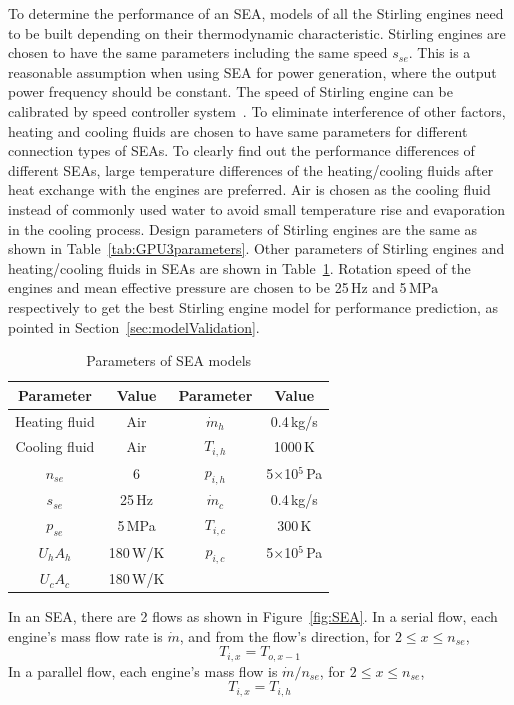 To determine the performance of an SEA, models of all the Stirling engines need to be built depending on their thermodynamic characteristic. Stirling engines are chosen to have the same parameters including the same speed $s_{se}$. This is a reasonable assumption when using SEA for power generation, where the output power frequency should be constant. The speed of Stirling engine can be calibrated by speed controller system~\cite{Hooshang2016}. To eliminate interference of other factors, heating and cooling fluids are chosen to have same parameters for different connection types of SEAs. To clearly find out the performance differences of different SEAs, large temperature differences of the heating/cooling fluids after heat exchange with the engines are preferred. Air is chosen as the cooling fluid instead of commonly used water to avoid small temperature rise and evaporation in the cooling process. Design parameters of Stirling engines are the same as shown in Table~\ref{tab:GPU3parameters}. Other parameters of Stirling engines and heating/cooling fluids in SEAs are shown in Table~\ref{tab:parameters}. Rotation speed of the engines and mean effective pressure are chosen to be 25$\,\mathrm{Hz}$ and 5$\,\mathrm{MPa}$ respectively to get the best Stirling engine model for performance prediction, as pointed in Section~\ref{sec:modelValidation}.

\begin{table}[htbp]
	\caption{Parameters of SEA models}
	\begin{center}
	\begin{tabular}{cccc}
		\toprule
		Parameter		&	Value	& Parameter	&	Value\\
		\midrule
		Heating fluid	&	Air		&	$\dot{m}_h$	&	0.4\,kg/s\\
		Cooling fluid	&	Air	&	$T_{i,h}$	&	1000\,K\\
		$n_{se}$	&	6	&	$p_{i,h}$	&	5$\times$10$^5$\,Pa\\
		$s_{se}$	&	25\,Hz	&	$\dot{m}_c$	&	0.4\,kg/s\\
		$p_{se}$		&	5\,MPa	&	$T_{i,c}$	&	300\,K\\
		$U_hA_h$	&	180\,W/K	&	$p_{i,c}$	&	5$\times$10$^5$\,Pa\\
		$U_cA_c$		&	180\,W/K	&&\\
		\bottomrule
	\end{tabular}
	\end{center}
	\label{tab:parameters}
\end{table}

In an SEA, there are 2 flows as shown in Figure~\ref{fig:SEA}. In a serial flow, each engine's mass flow rate is $\dot{m}$, and from the flow's direction, for $2\leqslant{}x\leqslant{}n_{se}$, 
\begin{equation}
	T_{i,x} = T_{o,x-1}
	\label{Eq:T_serial}
\end{equation}
In a parallel flow, each engine's mass flow is $\dot{m}/n_{se}$, for $2\leqslant{}x\leqslant{}n_{se}$,
\begin{equation}
	T_{i,x} = T_{i,h}
	\label{Eq:T_parallel}
\end{equation}

